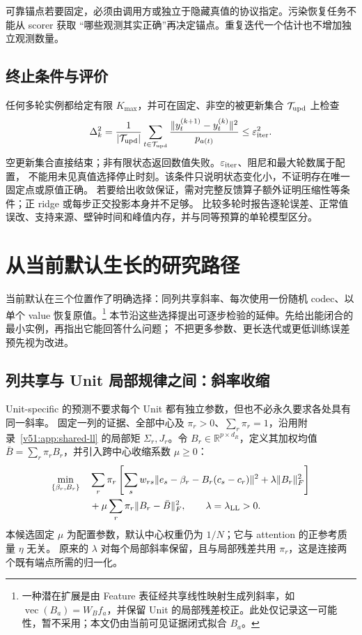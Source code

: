 \documentclass[11pt,UTF8,fontset=fandol]{ctexart}
\numberwithin{equation}{section}
\theoremstyle{definition}
\newcommand{\R}{\mathbb R}
\begin{document}
可靠锚点若要固定，必须由调用方或独立于隐藏真值的协议指定。污染恢复任务不能从 scorer 获取
“哪些观测其实正确”再决定锚点。重复迭代一个估计也不增加独立观测数量。

\subsection{终止条件与评价}
\label{v52:subsec:iteration-stop}
任何多轮实例都给定有限 $K_{\max}$，并可在固定、非空的被更新集合 $\mathcal T_{\rm upd}$ 上检查
\begin{equation}
 \Delta_k^2=\frac1{|\mathcal T_{\rm upd}|}
 \sum_{t\in\mathcal T_{\rm upd}}
 \frac{\|y_t^{(k+1)}-y_t^{(k)}\|^2}{p_{a(t)}}\le\varepsilon_{\rm iter}^2.
 \label{v52:eq:iteration-stop}
\end{equation}
空更新集合直接结束；非有限状态返回数值失败。$\varepsilon_{\rm iter}$、阻尼和最大轮数属于配置，
不能用未见真值选择停止时刻。该条件只说明状态变化小，不证明存在唯一固定点或原值正确。
若要给出收敛保证，需对完整反馈算子额外证明压缩性等条件；正 ridge 或每步正交投影本身并不足够。
比较多轮时报告逐轮误差、正常值误改、支持来源、壁钟时间和峰值内存，并与同等预算的单轮模型区分。



\section{从当前默认生长的研究路径}
\label{v53g:sec:growth}
当前默认在三个位置作了明确选择：同列共享斜率、每次使用一份随机 codec、以单个 value 恢复原值。\footnote{一种潜在扩展是由 Feature 表征经共享线性映射生成列斜率，如 $\operatorname{vec}(B_a)=W_Bf_a$，并保留 Unit 的局部残差校正。此处仅记录这一可能性，暂不采用；本文仍由当前可见证据闭式拟合 $B_a$。}
本节沿这些选择提出可逐步检验的延伸。先给出能闭合的最小实例，再指出它能回答什么问题；
不把更多参数、更长迭代或更低训练误差预先视为改进。

\subsection{列共享与 Unit 局部规律之间：斜率收缩}
\label{v53g:subsec:shrinkage}
Unit-specific 的预测不要求每个 Unit 都有独立参数，但也不必永久要求各处具有同一斜率。
固定一列的证据、全部中心及 $\pi_r>0$、$\sum_r\pi_r=1$，沿用附录~\ref{v51:app:shared-ll}
的局部矩 $\Sigma_r,J_r$。令 $B_r\in\R^{p\times d_R}$，定义其加权均值
$\bar B=\sum_r\pi_rB_r$，并引入跨中心收缩系数 $\mu\ge0$：
\begin{equation}
 \begin{split}
 \min_{\{\beta_r,B_r\}}\quad&
 \sum_r\pi_r\left[\sum_s w_{rs}
 \|e_s-\beta_r-B_r(c_s-c_r)\|^2+\lambda\|B_r\|_F^2\right]\\
 &+\mu\sum_r\pi_r\|B_r-\bar B\|_F^2,\qquad \lambda=\lambda_{\rm LL}>0.
 \end{split}
 \label{v53g:eq:shrinkage-objective}
\end{equation}
本候选固定 $\mu$ 为配置参数，默认中心权重仍为 $1/N$；它与 attention 的正参考质量 $\eta$ 无关。
原来的 $\lambda$ 对每个局部斜率保留，且与局部残差共用 $\pi_r$，这是连接两个既有端点所需的归一化。
\end{document}
